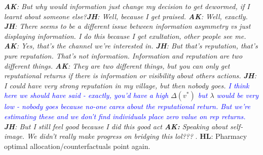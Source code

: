 \documentclass{article}
\begin{document}
\emph{\textbf{AK}: But why would information just change my decision to get dewormed, if I 
learnt about someone else?\textbf{JH}: Well, because I get praised. \textbf{AK}: Well, 
exactly. \textbf{JH}: There seems to be a different issue between information asymmetry vs 
just displaying information. I do this because I get exultation, other people see me. \textbf{AK}: Yes, 
that's the channel we're interested in. \textbf{JH}: But that's reputation, that's pure 
reputation. That's not information. Information and reputation are two different things. \textbf{AK}: 
They are two different things, but you can only get reputational returns if there is information or 
visibility about others actions. \textbf{JH}: I could have very strong reputation in my village, but then nobody goes.
\textcolor{blue}{I think here we should have said - exactly, you'd have a high} $\Delta(v^*)$ \textcolor{blue}{but 
}$\lambda$ \textcolor{blue}{would be very low - nobody goes because no-one cares about the reputational return. But 
we're estimating these and we don't find individuals place zero value on rep returns.} 
\textbf{JH}: But I still feel good because I did this good act \textbf{AK:} Speaking 
about self-image. We didn't really make progress on bridging this lol???
}.
\newline
\newline
\textbf{HL}: Pharmacy optimal allocation/counterfactuals point again.
\end{document}
